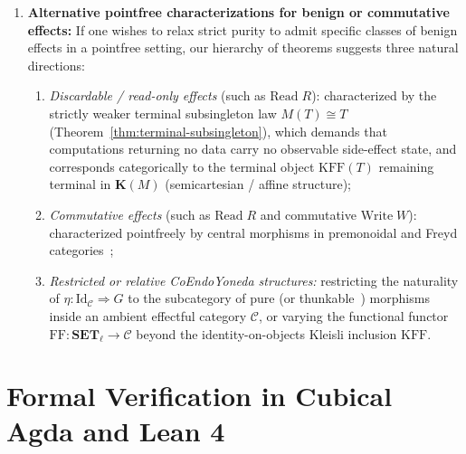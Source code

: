 \documentclass[11pt,a4paper]{article}
\theoremstyle{definition}
\theoremstyle{remark}
\newcommand{\Set}{\mathbf{SET}}
\newcommand{\Id}{\mathrm{Id}}
\newcommand{\FF}{\mathrm{FF}}
\newcommand{\KFF}{\mathrm{KFF}}
\newcommand{\K}{\mathbf{K}}
\begin{document}
\begin{enumerate}[label=(\arabic*),nosep]
  \vspace{3pt}
  \item \textbf{Alternative pointfree characterizations for benign or commutative effects:}
  If one wishes to relax strict purity to admit specific classes of benign effects in a pointfree
  setting, our hierarchy of theorems suggests three natural directions:
  \begin{enumerate}[label=(\alph*),nosep]
    \item \emph{Discardable / read-only effects} (such as $\mathrm{Read}\;R$): characterized by the
    strictly weaker terminal subsingleton law $M(T) \cong T$ (Theorem~\ref{thm:terminal-subsingleton}),
    which demands that computations returning no data carry no observable side-effect state, and corresponds
    categorically to the terminal object $\KFF(T)$ remaining terminal in $\K(M)$ (semicartesian / affine
    structure);
    \item \emph{Commutative effects} (such as $\mathrm{Read}\;R$ and commutative $\mathrm{Write}\;W$):
    characterized pointfreely by central morphisms in premonoidal and Freyd
    categories~\cite{PowerRobinson1997,LevyPowerThielecke2003};
    \item \emph{Restricted or relative CoEndoYoneda structures:} restricting the naturality of
    $\eta : \Id_{\mathcal{C}} \Rightarrow G$ to the subcategory of pure (or thunkable~\cite{Fuhrmann1999})
    morphisms inside an ambient effectful category $\mathcal{C}$, or varying the functional functor
    $\FF : \Set_\ell \to \mathcal{C}$ beyond the identity-on-objects Kleisli inclusion $\KFF$.
  \end{enumerate}
\end{enumerate}

\section{Formal Verification in Cubical Agda and Lean 4}\label{sec:formalization}
\end{document}
